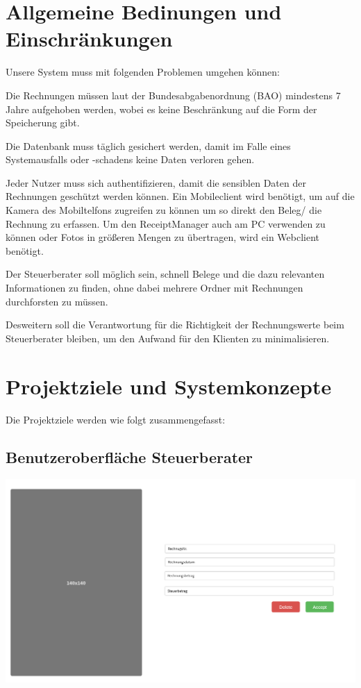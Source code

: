 \documentclass[12pt]{article}
\theoremstyle{definition}
\newcommand*{\skippingparagraph}{\par\vspace{\baselineskip}\noindent}
\begin{document}
\section{Allgemeine Bedinungen und Einschränkungen}
Unsere System muss mit folgenden Problemen umgehen können: 
\skippingparagraph
Die Rechnungen müssen laut der Bundesabgabenordnung (BAO) mindestens 7 Jahre aufgehoben werden, wobei es keine Beschränkung auf die Form der Speicherung gibt.
\skippingparagraph
Die Datenbank muss täglich gesichert werden, damit im Falle eines Systemausfalls oder -schadens keine Daten verloren gehen.
\skippingparagraph
Jeder Nutzer muss sich authentifizieren, damit die sensiblen Daten der Rechnungen geschützt werden können.
Ein Mobileclient wird benötigt, um auf die Kamera des Mobiltelfons zugreifen zu können um so direkt den Beleg/ die Rechnung zu erfassen. Um den ReceiptManager auch am PC verwenden zu können oder Fotos in größeren Mengen zu übertragen, wird ein Webclient benötigt.
\skippingparagraph
Der Steuerberater soll möglich sein, schnell Belege und die dazu relevanten Informationen zu finden, ohne dabei mehrere Ordner mit Rechnungen durchforsten zu müssen.
\skippingparagraph
Desweitern soll die Verantwortung für die Richtigkeit der Rechnungswerte beim Steuerberater bleiben, um den Aufwand für den Klienten zu minimalisieren.
\par
\pagebreak

\section{Projektziele und Systemkonzepte}
Die Projektziele werden wie folgt zusammengefasst:

\subsection{Benutzeroberfläche Steuerberater}


\includegraphics[width=\linewidth]{SingleReceiptReview}
\end{document}
